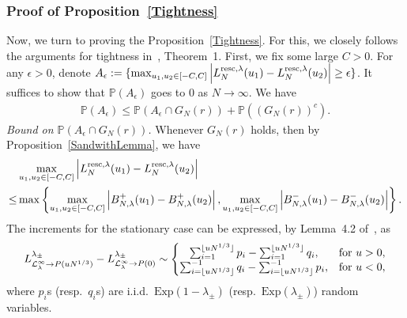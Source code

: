 \documentclass[12pt,a4paper]{article}
\numberwithin{equation}{section}
\newcommand{\Pb}{\mathbb{P}}
\begin{document}
\subsubsection{Proof of Proposition~\ref{Tightness}}
Now, we turn to proving the Proposition~\ref{Tightness}. For this, we closely follows the arguments for tightness in~\cite{Pi17}, Theorem~1.
First, we fix some large $C>0$. For any $\epsilon>0$, denote $A_\epsilon:= \{\max_{u_1,u_2\in[-C,C]} \left| L^{{\rm resc},\lambda}_{N}(u_1)- L^{{\rm resc},\lambda}_{N}(u_2)\right|\geq \epsilon\}$. It suffices to show that $\Pb(A_\epsilon )$ goes to $0$ as $N\to\infty$.
We have
\begin{align}\label{eq:SplittingProbability}
\Pb\left(A_\epsilon\right)\leq \Pb\left(A_\epsilon\cap G_N(r)\right) + \Pb((G_N(r))^c).
\end{align}
\emph{Bound on $\Pb\left(A_\epsilon\cap G_N(r)\right)$.}
 Whenever $G_N(r)$ holds, then by Proposition~\ref{SandwithLemma}, we have
 \begin{equation}\label{eq:Dominition}
 \begin{aligned}
& \max_{u_1,u_2\in[-C,C]} \left|L^{{\rm resc},\lambda}_{N}(u_1)- L^{{\rm resc},\lambda}_{N}(u_2)\right| \\
 \leq &\max\left\{\max_{u_1,u_2\in[-C,C]} \left|B^{+}_{N,\lambda}(u_1) - B^{+}_{N,\lambda}(u_2)\right|, \max_{u_1,u_2\in[-C,C]} \left|B^{-}_{N,\lambda}(u_1) - B^{-}_{N,\lambda}(u_2)\right|\right\}.
 \end{aligned}
 \end{equation}
The increments for the stationary case can be expressed, by Lemma~4.2 of~\cite{BCS06}, as
\begin{align}\label{eq:IIDIncrement}
L^{\lambda_\pm}_{{\cal L}_{\lambda}^\infty\to P(uN^{1/3})}- L^{\lambda_\pm}_{{\cal L}_{\lambda}^\infty\to P(0)}
\sim \left\{\begin{matrix}
\sum_{i=1}^{\lfloor uN^{1/3}\rfloor}p_i -\sum_{i=1}^{\lfloor uN^{1/3}\rfloor} q_i, & \text{for } u>0,\\
\sum_{i=\lfloor uN^{1/3}\rfloor}^{-1} q_{i} - \sum_{i=\lfloor uN^{1/3}\rfloor}^{-1}p_i, & \text{for } u<0,
\end{matrix}\right.
\end{align}
where $p_i$s (resp.\ $q_i$s) are i.i.d.\ $\mbox{Exp}(1-\lambda_{\pm})$ (resp.\ $\mbox{Exp}(\lambda_{\pm})$) random variables.
\end{document}
